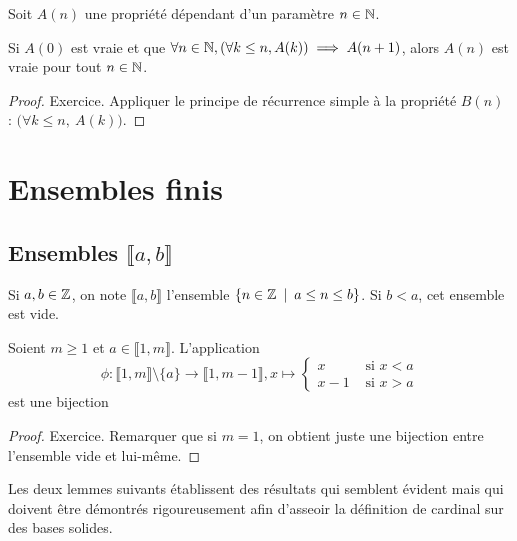 \begin{theoreme}
Soit $A(n)$ une propriété dépendant d'un paramètre $n\in \mathbb{N}$. 

Si $A(0)$ est vraie et que $\forall n\in \mathbb{N}, (\forall k\leq n, A(k))\implies A(n+1)$, alors $A(n)$ est vraie pour tout $n\in \mathbb{N}$.
\end{theoreme}
\begin{proof}
Exercice. Appliquer le principe de  récurrence simple à la propriété $B(n)$ : \og $\big(\forall k\leq n,\: A(k)\big)$\fg.
\end{proof}
\section{Ensembles finis}

\subsection{Ensembles $\llbracket a,b\rrbracket$}

Si $a, b\in \mathbb{Z}$, on note $\llbracket a,b\rrbracket$ l'ensemble $\{n\in \Z\:\mid\: a\leq n \leq b\}$. Si $b<a$, cet ensemble est vide.

\begin{lemme} Soient $m\geq 1$ et $a\in \llbracket 1,m\rrbracket$. L'application 
\[
\phi : \llbracket 1,m\rrbracket \setminus \{a\} \to \llbracket 1,m-1\rrbracket, 
x\mapsto \begin{cases}x & \text{ si }x<a\\x-1 & \text{ si }x>a\end{cases}
\]
est une bijection
\end{lemme}
\begin{proof} Exercice. Remarquer que si $m=1$, on obtient juste une bijection entre l'ensemble vide et lui-même.
\end{proof}


Les deux lemmes suivants établissent des résultats qui semblent \og évident\fg{} mais qui doivent être démontrés rigoureusement afin d'asseoir la définition de cardinal sur des bases solides.

